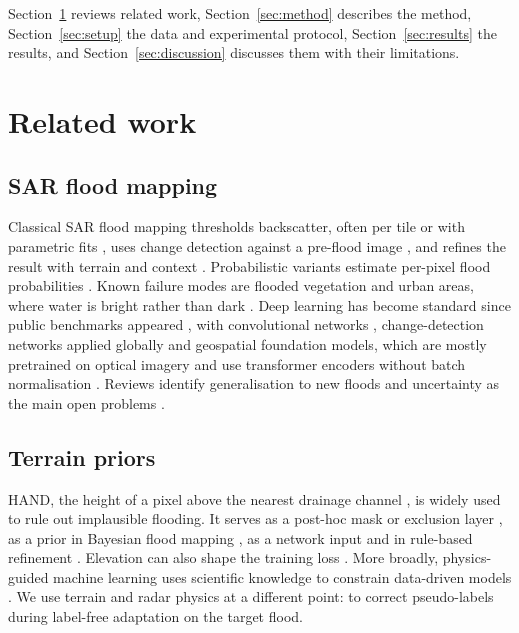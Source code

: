 \documentclass[a4paper,fleqn]{cas-sc}
\begin{document}
Section~\ref{sec:related} reviews related work, Section~\ref{sec:method} describes the method, Section~\ref{sec:setup} the data and experimental protocol, Section~\ref{sec:results} the results, and Section~\ref{sec:discussion} discusses them with their limitations.

\section{Related work}
\label{sec:related}

\subsection{SAR flood mapping}
Classical SAR flood mapping thresholds backscatter, often per tile or with parametric fits \citep{otsu1979threshold,martinis2009nrt,chini2017hsbt}, uses change detection against a pre-flood image \citep{giustarini2013change,clement2018multitemporal}, and refines the result with terrain and context \citep{twele2016s1chain,landuyt2019assessment}. Probabilistic variants estimate per-pixel flood probabilities \citep{giustarini2016probabilistic,krullikowski2023gfmensemble}. Known failure modes are flooded vegetation and urban areas, where water is bright rather than dark \citep{tsyganskaya2018vegetation,zhao2024urbansarfloods}. Deep learning has become standard since public benchmarks appeared \citep{bonafilia2020sen1floods11,mateogarcia2021worldfloods,drakonakis2022ombrianet,bountos2024kurosiwo,montello2022mmflood}, with convolutional networks \citep{nemni2020unosat,bai2021basnet,konapala2021s1s2}, change-detection networks applied globally \citep{misra2025globalfloods} and geospatial foundation models, which are mostly pretrained on optical imagery and use transformer encoders without batch normalisation \citep{jakubik2023prithvi}. Reviews identify generalisation to new floods and uncertainty as the main open problems \citep{bentivoglio2022review,lee2025geoaiflood}.

\subsection{Terrain priors}
HAND, the height of a pixel above the nearest drainage channel \citep{renno2008hand,nobre2011hand}, is widely used to rule out implausible flooding. It serves as a post-hoc mask or exclusion layer \citep{twele2016s1chain,zhao2021exclusion,misra2025globalfloods}, as a prior in Bayesian flood mapping \citep{tupas2023handprior}, as a network input \citep{tian2026deepsar} and in rule-based refinement \citep{hansen2025ribe}. Elevation can also shape the training loss \citep{sami2024evanet}. More broadly, physics-guided machine learning uses scientific knowledge to constrain data-driven models \citep{karpatne2017tgds,reichstein2019deep,willard2022integrating}. We use terrain and radar physics at a different point: to correct pseudo-labels during label-free adaptation on the target flood.
\end{document}
